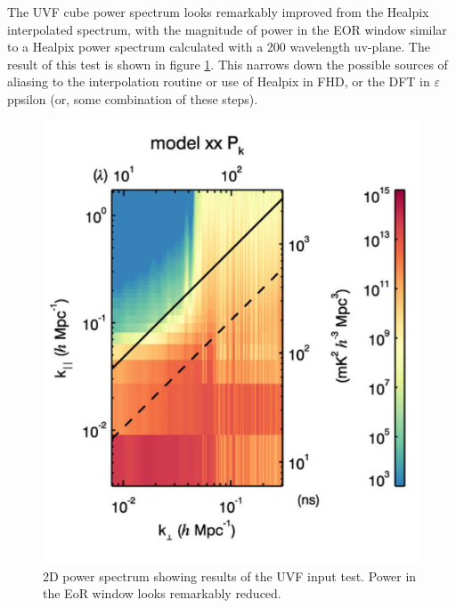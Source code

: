 \documentclass[linenumbers]{aastex631}
\newcommand\eppsilon{$\varepsilon$ppsilon\xspace}
\begin{document}
The UVF cube power spectrum looks remarkably improved from the Healpix interpolated spectrum, with the magnitude of power in the EOR window similar to a Healpix power spectrum calculated with a 200 wavelength uv-plane. The result of this test is shown in figure \ref{fig:uvfresult}. This narrows down the possible sources of aliasing to the interpolation routine or use of Healpix in FHD, or the DFT in \eppsilon{} (or, some combination of these steps). \\
\begin{figure}[!h]
    \centering
    \includegraphics[scale=.4]{uvf.png}
    \caption{2D power spectrum showing results of the UVF input test. Power in the EoR window looks remarkably reduced.}
    \label{fig:uvfresult}
\end{figure}
\end{document}
